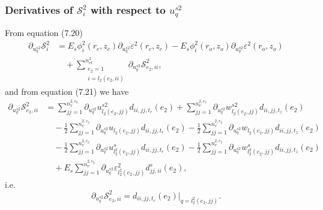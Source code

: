 \documentclass{article}
\begin{document}
\subsubsection{Derivatives of $\mathcal{S}_i^2$ with respect to $u_q^{s2}$} %
From equation (7.20)
\begin{align}
\partial_{u_q^{s2}} \mathcal{S}_i^2 &= E_s \phi_i^2(r_c,z_c) \partial_{u_q^{s2}} \varepsilon^2(r_c,z_c) - E_s \phi_i^2(r_o,z_o) \partial_{u_q^{s2}} \varepsilon^2(r_o,z_o) \nonumber\\
&\quad + \sum_{\substack{e_2=1\\ i=l_2(e_2,ii)}}^{n_{el}^2} \partial_{u_q^{s2}} \mathcal{S}_{e_2,ii}^2, \tag{7.30}
\end{align}
and from equation (7.21) we have
\begin{align}
\partial_{u_q^{s2}} \mathcal{S}_{e_2,ii}^2 &= \sum_{jj=1}^{n_v^{2,e_2}} \partial_{u_q^{s2}} u_{l_2(e_2,jj)}^{s2} d_{ii,jj,t_r}(e_2) + \sum_{jj=1}^{n_v^{2,e_2}} \partial_{u_q^{s2}} w_{l_2(e_2,jj)}^{s2} d_{ii,jj,t_z}(e_2) \nonumber\\
&\quad - \frac{1}{2} \sum_{jj=1}^{n_v^{2,e_2}} \partial_{u_q^{s2}} u_{l_2(e_2,jj)} d_{ii,jj,t_r}(e_2) - \frac{1}{2} \sum_{jj=1}^{n_v^{2,e_2}} \partial_{u_q^{s2}} w_{l_2(e_2,jj)} d_{ii,jj,t_z}(e_2) \nonumber\\
&\quad - \frac{1}{2} \sum_{jj=1}^{n_v^{2,e_2}} \partial_{u_q^{s2}} u_{l_2^2(e_2,jj)}^s d_{ii,jj,t_r}(e_2) - \frac{1}{2} \sum_{jj=1}^{n_v^{2,e_2}} \partial_{u_q^{s2}} w_{l_2^2(e_2,jj)}^s d_{ii,jj,t_z}(e_2) \nonumber\\
&\quad + E_s \sum_{jj=1}^{n_v^{2,e_2}} \partial_{u_q^{s2}} \varepsilon_{l_2^2(e_2,jj)}^2 d_{jj,ii}^s(e_2), \tag{7.31}
\end{align}
i.e.
\begin{equation}
\partial_{u_q^{s2}} \mathcal{S}_{e_2,ii}^2 = d_{ii,jj,t_r}(e_2) \big|_{q=l_2^2(e_2,jj)}. \tag{7.32}
\end{equation}
\end{document}
